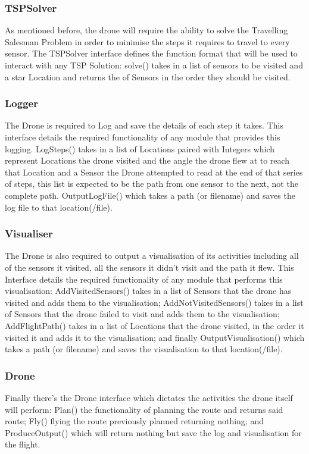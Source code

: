\documentclass[12pt]{article}
\begin{document}
\subsubsection{TSPSolver}
As mentioned before, the drone will require the ability to solve the Travelling Salesman Problem in order to minimise the steps it requires to travel to every sensor. The TSPSolver interface defines the function format that will be used to interact with any TSP Solution: solve() takes in a list of sensors to be visited and a star Location and returns the of Sensors in the order they should be visited.
\subsubsection{Logger}
The Drone is required to Log and save the details of each step it takes. This interface details the required functionality of any module that provides this logging. LogSteps() takes in a list of Locations paired with Integers which represent Locations the drone visited and the angle the drone flew at to reach that Location and a Sensor the Drone attempted to read at the end of that series of steps, this list is expected to be the path from one sensor to the next, not the complete path. OutputLogFile() which takes a path (or filename) and saves the log file to that location(/file).
\subsubsection{Visualiser}
The Drone is also required to output a visualisation of its activities including all of the sensors it visited, all the sensors it didn't visit and the path it flew. This Interface details the required functionality of any module that performs this visualisation: AddVisitedSensors() takes in a list of Sensors that the drone has visited and adds them to the visualisation; AddNotVisitedSensors() takes in a list of Sensors that the drone failed to visit and adds them to the visualisation; AddFlightPath() takes in a list of Locations that the drone visited, in the order it visited it and adds it to the visualisation; and finally OutputVisualisation() which takes a path (or filename) and saves the visualisation to that location(/file).
\subsubsection{Drone}
Finally there's the Drone interface which dictates the activities the drone itself will perform: Plan() the functionality of planning the route and returns said route; Fly() flying the route previously planned returning nothing; and ProduceOutput() which will return nothing but save the log and visualisation for the flight.
\end{document}
